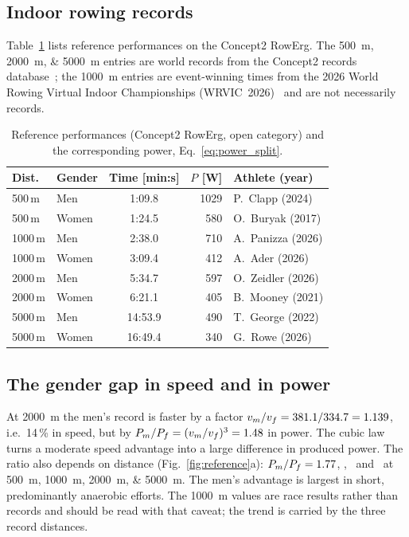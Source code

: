 \documentclass[twocolumn, 10pt]{article}
\begin{document}
\subsection{Indoor rowing records}

Table~\ref{tab:records} lists reference performances on the Concept2 RowErg.
The \SIlist{500;2000;5000}{m} entries are world records from the Concept2
records database~\cite{Concept2records}; the \SI{1000}{m} entries are
event-winning times from the 2026 World Rowing Virtual Indoor Championships
(WRVIC~2026)~\cite{WorldRowingWRVIC2026} and are not necessarily records.

\begin{table}[ht]
  \centering
  \caption{Reference performances (Concept2 RowErg, open category) and the
           corresponding power, Eq.~\eqref{eq:power_split}.}
  \label{tab:records}
  \setlength{\tabcolsep}{4pt}
  \begin{tabular}{@{}llcrl@{}}
    \toprule
    Dist. & Gender & Time [min:s] & $P$ [W] & Athlete (year)\\
    \midrule
    500\,m  & Men   & 1:09.8  & 1029 & P.\ Clapp (2024)    \\
    500\,m  & Women & 1:24.5  &  580 & O.\ Buryak (2017)   \\
    1000\,m & Men   & 2:38.0  &  710 & A.\ Panizza (2026)  \\
    1000\,m & Women & 3:09.4  &  412 & A.\ Ader (2026)     \\
    2000\,m & Men   & 5:34.7  &  597 & O.\ Zeidler (2026)  \\
    2000\,m & Women & 6:21.1  &  405 & B.\ Mooney (2021)   \\
    5000\,m & Men   & 14:53.9 &  490 & T.\ George (2022)   \\
    5000\,m & Women & 16:49.4 &  340 & G.\ Rowe (2026)     \\
    \bottomrule
  \end{tabular}
\end{table}

\subsection{The gender gap in speed and in power}

At \SI{2000}{m} the men's record is faster by a factor
$v_m/v_f=381.1/334.7=1.139$, i.e.\ 14\,\% in speed, but by
$P_m/P_f=(v_m/v_f)^3=1.48$ in power.
The cubic law turns a moderate speed advantage into a large difference in
produced power.
The ratio also depends on distance
(Fig.~\ref{fig:reference}a): $P_m/P_f=1.77$, \RatioOneK, \RatioTwoK\
and \RatioFiveK\ at \SIlist{500;1000;2000;5000}{m}.
The men's advantage is largest in short, predominantly anaerobic efforts.
The \SI{1000}{m} values are race results rather than records and should be
read with that caveat; the trend is carried by the three record distances.
\end{document}
